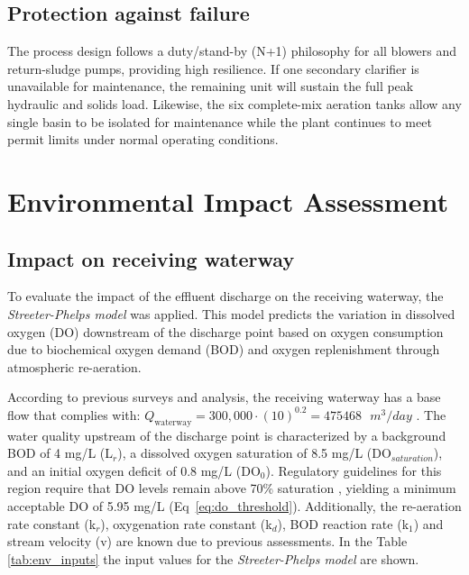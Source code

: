 \documentclass[11pt]{article}
\begin{document}
\subsection{Protection against failure}
\label{sec:protection_against_failue_secondary_treat}

The process design follows a duty/stand-by (N+1) 
philosophy for all blowers and return-sludge pumps, 
providing high resilience. If one secondary clarifier 
is unavailable for maintenance, the remaining unit will 
sustain the full peak hydraulic and solids load. 
Likewise, the six complete-mix aeration tanks allow 
any single basin to be isolated for maintenance 
while the plant continues to meet permit limits 
under normal operating conditions.


\section{Environmental Impact Assessment}
\label{sec:env_impact}

\subsection{Impact on receiving waterway}

To evaluate the impact of the effluent discharge on the receiving waterway, 
the \textit{Streeter-Phelps model} was applied. This model predicts the variation in dissolved 
oxygen (DO) downstream of the discharge point based on oxygen consumption due to biochemical 
oxygen demand (BOD) and oxygen replenishment through atmospheric re-aeration.

According to previous surveys and analysis, the receiving waterway has a base flow that complies
with: 
\(Q_{\text{waterway}} = 300{,}000 \cdot \left(\text{10}\right)^{0.2} = 475468 \text{ } m^3/day\)
. The water quality upstream 
of the discharge point is characterized by a background BOD of 4 mg/L (L$_r$), a dissolved oxygen saturation 
of 8.5 mg/L (DO$_{saturation}$), and an initial oxygen deficit of 0.8 mg/L (DO$_0$). Regulatory guidelines for this region require 
that DO levels remain above 70\% saturation \cite{yarravalleywater_2023_amf}, yielding a minimum acceptable DO of 5.95 mg/L (Eq~\eqref{eq:do_threshold}).
Additionally, the re-aeration rate constant (k$_r$), oxygenation rate constant (k$_d$), BOD reaction rate
(k$_1$) and stream velocity (v) are known due to previous assessments. In the Table \ref{tab:env_inputs} the
input values for the \textit{Streeter-Phelps model} are shown.\\
\end{document}
